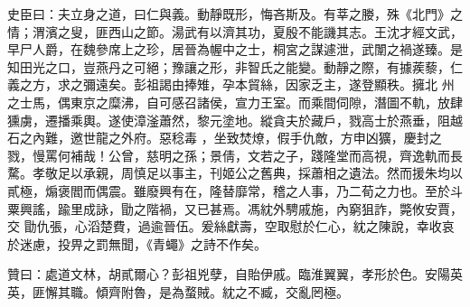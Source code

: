 \begin{pinyinscope}
史臣曰：夫立身之道，曰仁與義。動靜既形，悔吝斯及。有莘之媵，殊《北門》之情；渭濱之叟，匪西山之節。湯武有以濟其功，夏殷不能譏其志。王沈才經文武，早尸人爵，在魏參席上之珍，居晉為幄中之士，桐宮之謀遽泄，武闈之禍遂臻。是知田光之口，豈燕丹之可絕；豫讓之形，非智氏之能變。動靜之際，有據蒺藜，仁義之方，求之彌遠矣。彭祖謁由捧雉，孕本貿絲，因家乏主，遂登顯秩。擁北
 州之士馬，偶東京之糜沸，自可感召諸侯，宣力王室。而乘間伺隙，潛圖不軌，放肆獯虜，遷播乘輿。遂使漳滏蕭然，黎元塗地。縱貪夫於藏戶，戮高士於燕垂，阻越石之內難，邀世龍之外府。惡稔毒
 ，坐致焚燎，假手仇敵，方申凶獷，慶封之戮，慢罵何補哉！公曾，慈明之孫；景倩，文若之子，踐隆堂而高視，齊逸軌而長騖。孝敬足以承親，周慎足以事主，刊姬公之舊典，採蕭相之遺法。然而援朱均以貳極，煽褒閻而偶震。雖廢興有在，隆替靡常，稽之人事，乃二荀之力也。至於斗粟興謠，踰里成詠，勖之階禍，又已甚焉。馮紞外騁戚施，內窮狙詐，斃攸安賈，交
 勖仇張，心滔楚費，過逾晉伍。爰絲獻壽，空取慰於仁心，紞之陳說，幸收哀於迷慮，投畀之罰無聞，《青蠅》之詩不作矣。



 贊曰：處道文林，胡貳爾心？彭祖兇孽，自貽伊戚。臨淮翼翼，孝形於色。安陽英英，匪懈其職。傾齊附魯，是為蝥賊。紞之不臧，交亂罔極。



\end{pinyinscope}